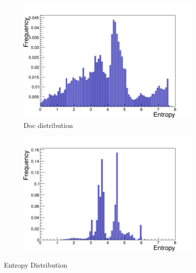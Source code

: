 \begin{figure}[!ht]
   \begin{subfigure}[b]{.5\linewidth}
    \raggedleft
     \includegraphics[scale=0.32]{figures/entropy/Entropy_doc}
   \caption{Doc distribution}
    \label{fig:1c}
  \end{subfigure}%
  \begin{subfigure}[b]{.5\linewidth}
    \raggedright
        \includegraphics[scale=0.32]{figures/entropy/Entropy_text}
    \label{fig:1d}
  \end{subfigure}
  
  
  \caption{Entropy Distribution}
  \label{fig:entropy}
  
\end{figure}